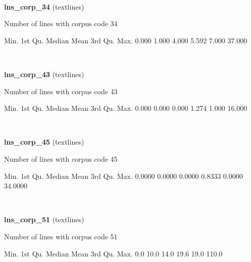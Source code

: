 \documentclass[]{article}
\newenvironment{Shaded}{\begin{snugshade}}{\end{snugshade}}
\newcommand{\FloatTok}[1]{\textcolor[rgb]{0.00,0.00,0.81}{{#1}}}
\newcommand{\NormalTok}[1]{{#1}}
\begin{document}
~

\vspace{1em}

\textbf{lns\_corp\_34} (textlines)

Number of lines with corpus code 34

\begin{Shaded}
\begin{Highlighting}[]
   \NormalTok{Min. 1st Qu.  Median    Mean 3rd Qu.    Max. }
  \FloatTok{0.000}   \FloatTok{1.000}   \FloatTok{4.000}   \FloatTok{5.592}   \FloatTok{7.000}  \FloatTok{37.000} 
\end{Highlighting}
\end{Shaded}

~

\vspace{1em}

\textbf{lns\_corp\_43} (textlines)

Number of lines with corpus code 43

\begin{Shaded}
\begin{Highlighting}[]
   \NormalTok{Min. 1st Qu.  Median    Mean 3rd Qu.    Max. }
  \FloatTok{0.000}   \FloatTok{0.000}   \FloatTok{0.000}   \FloatTok{1.274}   \FloatTok{1.000}  \FloatTok{16.000} 
\end{Highlighting}
\end{Shaded}

~

\vspace{1em}

\textbf{lns\_corp\_45} (textlines)

Number of lines with corpus code 45

\begin{Shaded}
\begin{Highlighting}[]
   \NormalTok{Min. 1st Qu.  Median    Mean 3rd Qu.    Max. }
 \FloatTok{0.0000}  \FloatTok{0.0000}  \FloatTok{0.0000}  \FloatTok{0.8333}  \FloatTok{0.0000} \FloatTok{34.0000} 
\end{Highlighting}
\end{Shaded}

~

\vspace{1em}

\textbf{lns\_corp\_51} (textlines)

Number of lines with corpus code 51

\begin{Shaded}
\begin{Highlighting}[]
   \NormalTok{Min. 1st Qu.  Median    Mean 3rd Qu.    Max. }
    \FloatTok{0.0}    \FloatTok{10.0}    \FloatTok{14.0}    \FloatTok{19.6}    \FloatTok{19.0}   \FloatTok{110.0} 
\end{Highlighting}
\end{Shaded}
\end{document}
